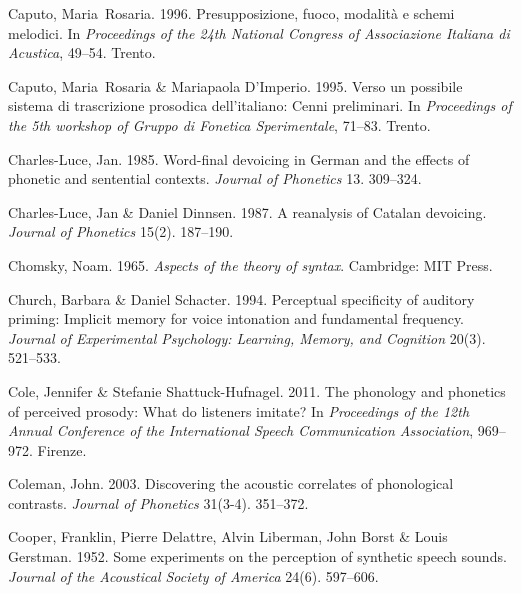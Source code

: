 \documentclass[ number=1
,series=labphon
,output=long
,url=http://langsci-press.org/catalog/book/16
,isbn=978-3-944675-01-5
]{LSP/langsci}
\begin{document}
\begin{thebibliography}{284}
Caputo, Maria~Rosaria. 1996.
\newblock Presupposizione, fuoco, modalità e schemi melodici.
\newblock In \emph{Proceedings of the 24th {National Congress of Associazione
  Italiana di Acustica}}, 49--54. Trento.

Caputo, Maria~Rosaria \& Mariapaola D'Imperio. 1995.
\newblock Verso un possibile sistema di trascrizione prosodica dell’italiano:
  {C}enni preliminari.
\newblock In \emph{Proceedings of the 5th workshop of {Gruppo di Fonetica
  Sperimentale}}, 71--83. Trento.

Charles-Luce, Jan. 1985.
\newblock Word-final devoicing in {G}erman and the effects of phonetic and
  sentential contexts.
\newblock \emph{Journal of Phonetics} 13. 309--324.

Charles-Luce, Jan \& Daniel Dinnsen. 1987.
\newblock A reanalysis of {C}atalan devoicing.
\newblock \emph{Journal of Phonetics} 15(2). 187--190.

Chomsky, Noam. 1965.
\newblock \emph{Aspects of the theory of syntax}.
\newblock Cambridge: MIT Press.

Church, Barbara \& Daniel Schacter. 1994.
\newblock Perceptual specificity of auditory priming: {I}mplicit memory for
  voice intonation and fundamental frequency.
\newblock \emph{Journal of Experimental Psychology: Learning, Memory, and
  Cognition} 20(3). 521--533.

Cole, Jennifer \& Stefanie Shattuck-Hufnagel. 2011.
\newblock The phonology and phonetics of perceived prosody: {W}hat do listeners
  imitate?
\newblock In \emph{Proceedings of the 12th {Annual Conference of the
  International Speech Communication Association}}, 969--972. Firenze.

Coleman, John. 2003.
\newblock Discovering the acoustic correlates of phonological contrasts.
\newblock \emph{Journal of Phonetics} 31(3-4). 351--372.

Cooper, Franklin, Pierre Delattre, Alvin Liberman, John Borst \& Louis
  Gerstman. 1952.
\newblock Some experiments on the perception of synthetic speech sounds.
\newblock \emph{Journal of the Acoustical Society of America} 24(6). 597--606.


\end{thebibliography}
\end{document}
